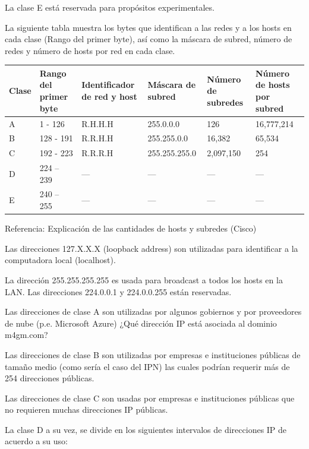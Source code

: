 La clase E está reservada para propósitos experimentales.

La siguiente tabla muestra los bytes que identifican a las redes y a los hosts en cada clase (Rango del primer byte), así como la máscara de subred, número de redes y número de hosts por red en cada clase.

\begin{center}
\small
\begin{tabularx}{\linewidth}{|X|X|X|X|X|X|}
\hline
Clase & Rango del primer byte & Identificador de red y host & Máscara de subred & Número de subredes & Número de hosts por subred \\ \hline
A & 1 - 126 & R.H.H.H & 255.0.0.0 & 126 & 16,777,214 \\ \hline
B & 128 - 191 & R.R.H.H & 255.255.0.0 & 16,382 & 65,534 \\ \hline
C & 192 - 223 & R.R.R.H & 255.255.255.0 & 2,097,150 & 254 \\ \hline
D & 224 – 239 & — & — & — & — \\ \hline
E & 240 – 255 & — & — & — & — \\ \hline
\end{tabularx}
\end{center}

Referencia: Explicación de las cantidades de hosts y subredes (Cisco)

Las direcciones 127.X.X.X (loopback address) son utilizadas para identificar a la computadora local (localhost).

La dirección 255.255.255.255 es usada para broadcast a todos los hosts en la LAN. Las direcciones 224.0.0.1 y 224.0.0.255 están reservadas.

Las direcciones de clase A son utilizadas por algunos gobiernos y por proveedores de nube (p.e. Microsoft Azure) ¿Qué dirección IP está asociada al dominio m4gm.com?

Las direcciones de clase B son utilizadas por empresas e instituciones públicas de tamaño medio (como sería el caso del IPN) las cuales podrían requerir más de 254 direcciones públicas.

Las direcciones de clase C son usadas por empresas e instituciones públicas que no requieren muchas direcciones IP públicas.

La clase D a su vez, se divide en los siguientes intervalos de direcciones IP de acuerdo a su uso:

